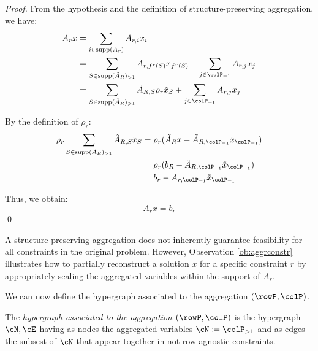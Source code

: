 \begin{proof}
From the hypothesis and the definition of structure-preserving aggregation, we have:
\begin{align*}
A_r x &= \sum_{i \in \supp(A_r)} A_{r,i} x_i \\
&= \sum_{S \in \supp(\tilde{A}_R)_{>1}} A_{r,f^r(S)} x_{f^r(S)} + 
\sum_{j \in \colP_{=1}} A_{r,j} x_j \\
&= \sum_{S \in \supp(\tilde{A}_R)_{>1}} \tilde{A}_{R,S} \rho_r \tilde{x}_S + 
\sum_{j \in \colP_{=1}} A_{r,j} x_j
\end{align*}

By the definition of \(\rho_r\):
\begin{align*}
\rho_r \sum_{S \in \supp(\tilde{A}_R)_{>1}} \tilde{A}_{R,S} \tilde{x}_S 
&= \rho_r (\tilde{A}_R \tilde{x} - \tilde{A}_{R,\colP_{=1}} \tilde{x}_{\colP_{=1}}) \\
&= \rho_r (\tilde{b}_R - \tilde{A}_{R,\colP_{=1}} \tilde{x}_{\colP_{=1}}) \\
&= b_r - A_{r, \colP_{=1}} \tilde{x}_{\colP_{=1}}
\end{align*}

Thus, we obtain:
\[
A_r x = b_r
\]
\qed
\end{proof}

A structure-preserving aggregation does not inherently guarantee feasibility for all constraints in the original problem. However, Observation \ref{ob:aggrconstr} illustrates how to partially reconstruct a solution \(x\) for a specific constraint \(r\) by appropriately scaling the aggregated variables within the support of \(A_r\). 

We can now define the hypergraph associated to the aggregation \((\rowP, \colP)\).
\begin{definition}
  The \emph{hypergraph associated to the aggregation \((\rowP, \colP)\)} is the hypergraph \(\cN, \cE\) having as nodes the aggregated variables \(\cN \coloneqq \colP_{>1}\) and as edges the subsest of \(\cN\) that appear together in not row-agnostic constraints.
\end{definition}

